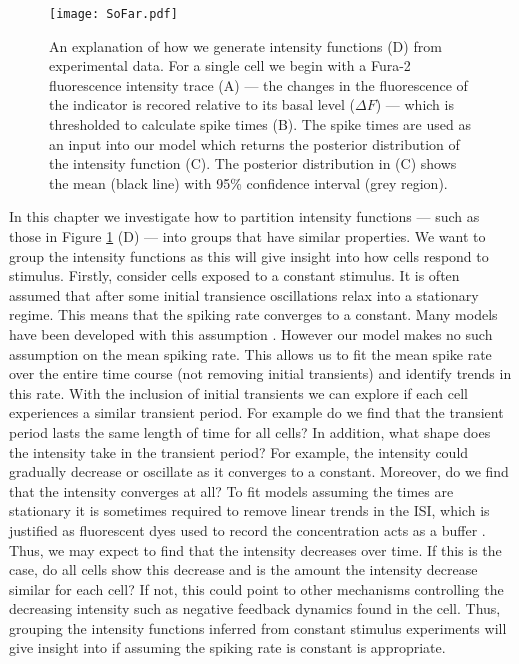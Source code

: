 \documentclass[12pt]{book} %
\begin{document}
     \begin{figure}[t!]
   \hrulefill
   \begin{center} 
    {\texttt{[image: SoFar.pdf]} }
    \end{center}     
    \caption{An explanation of how we generate intensity functions (D) from experimental data. For a single cell we begin with a Fura-2 fluorescence intensity trace (A) --- the changes in the fluorescence of the  indicator is recored relative to its basal level ($\Delta F$) --- which is thresholded to calculate  spike times (B). The  spike times are used as an input into our model which returns the posterior distribution of the intensity function (C). The posterior distribution in (C) shows the mean (black line) with 95\% confidence interval (grey region).}
    \label{fig:SoFar}
    \hrulefill
    \end{figure}
    
In this chapter we investigate how to partition intensity functions --- such as those in Figure \ref{fig:SoFar} (D) ---  into groups that have similar properties. We want to group the intensity functions as this will give insight into how cells respond to stimulus.
 Firstly, consider cells exposed to a constant stimulus. It is often assumed that after some initial transience  oscillations relax into a stationary regime. This means that the spiking rate converges to a constant. Many models have been developed with this assumption \cite{}. However our model makes no such assumption on the mean spiking rate. This allows us to fit the mean  spike rate over the entire time course (not removing initial transients) and identify trends in this rate. With the inclusion of initial transients we can explore if each cell experiences a similar transient period. For example do we find that the transient period lasts the same length of time for all cells? In addition, what shape does the intensity take in the transient period? For example, the intensity could gradually decrease or oscillate as it converges to a constant. Moreover, do we find that the intensity converges at all? To fit models assuming the  times are stationary it is sometimes required to remove linear trends in the ISI, which is justified as fluorescent dyes used to record the  concentration acts as a  buffer \cite{}. Thus, we may expect to find that the intensity decreases over time. If this is the case, do all cells show this decrease and is the amount the intensity decrease similar for each cell? If not, this could point to other mechanisms controlling the decreasing intensity such as negative feedback dynamics found in the cell. Thus, grouping the intensity functions inferred from constant stimulus experiments will give insight into if assuming the spiking rate is constant is appropriate.
\end{document}
